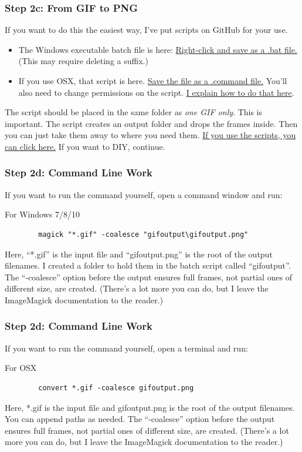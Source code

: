 \documentclass{beamer}
\begin{document}
\begin{frame}
	\frametitle{Step 2c: From GIF to PNG}
	If you want to do this the easiest way, I've put scripts on GitHub for your use.
	\begin{itemize}
		\item The Windows executable batch file is here: \href{https://raw.githubusercontent.com/abhworthington/gifsinbeamer/master/ImageMagickscripts/giftopng.bat}{Right-click and save as a .bat file.} (This may require deleting a suffix.)
		\item If you use OSX, that script is here. \href{https://github.com/abhworthington/gifsinbeamer/blob/master/ImageMagickscripts/giftopng.command}{Save the file as a .command file.} You'll also need to change permissions on the script. \href{https://github.com/abhworthington/gifsinbeamer/blob/master/ImageMagickscripts/OSX/OSXfirsttime.txt}{I explain how to do that here}.
	\end{itemize}
	The script should be placed in the same folder as \emph{one GIF only}. This is important. The script creates an output folder and drops the frames inside. Then you can just take them away to where you need them. \hyperlink{STEP3a}{If you use the scripts, you can click here.} If you want to DIY, continue.
\end{frame}

\begin{frame}[fragile]
	\frametitle{Step 2d: Command Line Work}
	If you want to run the command yourself, open a command window and run:
		\begin{block}{For Windows 7/8/10}
		\begin{verbatim}
		magick "*.gif" -coalesce "gifoutput\gifoutput.png"
		\end{verbatim}
		\end{block}
	Here, ``*.gif'' is the input file and ``gifoutput.png'' is the root of the output filenames. I created a folder to hold them in the batch script called ``gifoutput''. The ``-coalesce'' option before the output ensures full frames, not partial ones of different size, are created. (There's a lot more you can do, but I leave the ImageMagick documentation to the reader.)
\end{frame}

\begin{frame}[fragile]
	\frametitle{Step 2d: Command Line Work}
	If you want to run the command yourself, open a terminal and run:
		\begin{block}{For OSX}
		\begin{verbatim}
		convert *.gif -coalesce gifoutput.png
		\end{verbatim}
		\end{block}
		Here, *.gif is the input file and gifoutput.png is the root of the output filenames. You can append paths as needed. The ``-coalesce'' option before the output ensures full frames, not partial ones of different size, are created. (There's a lot more you can do, but I leave the ImageMagick documentation to the reader.)
\end{frame}
\end{document}
